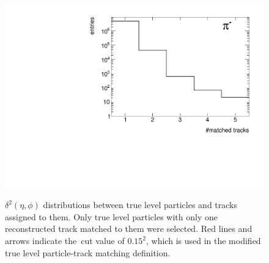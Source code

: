 \begin{figure}[hb]
{		\includegraphics[width=\linewidth,page=30]{graphics/eff/trackSplitting_CD.pdf}\\
	}%
	\caption[$\delta^{2}\left(\eta,\phi\right)$ distributions between true level particles and tracks assigned to them.]{$\delta^{2}\left(\eta,\phi\right)$ distributions  between true level particles and tracks assigned to them. Only true level particles with only one reconstructed track matched to them were selected. Red lines and arrows indicate  the~cut value of $0.15^2$, which is used in the modified true level particle-track matching definition.}\label{fig:trackSplittingNominalDelta_1}
\end{figure}

